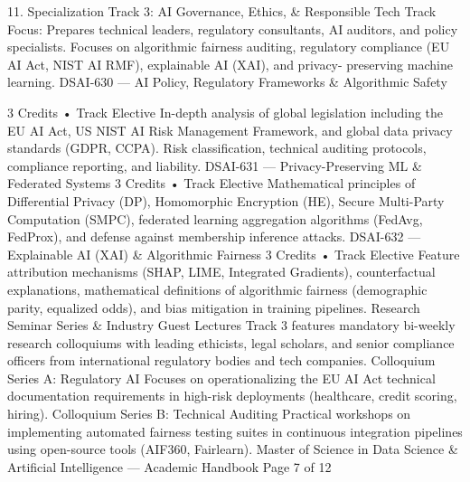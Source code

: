 \documentclass[12pt]{article}
\begin{document}
11. Specialization Track 3: AI Governance, Ethics, \& Responsible Tech
Track Focus: Prepares technical leaders, regulatory consultants, AI auditors, and policy specialists. Focuses on
algorithmic fairness auditing, regulatory compliance (EU AI Act, NIST AI RMF), explainable AI (XAI), and privacy-
preserving machine learning.
DSAI-630 — AI Policy, Regulatory Frameworks \& Algorithmic Safety

3 Credits • Track Elective
In-depth analysis of global legislation including the EU AI Act, US NIST AI Risk Management Framework, and
global data privacy standards (GDPR, CCPA). Risk classification, technical auditing protocols, compliance
reporting, and liability.
DSAI-631 — Privacy-Preserving ML \& Federated Systems
3 Credits • Track Elective
Mathematical principles of Differential Privacy (DP), Homomorphic Encryption (HE), Secure Multi-Party
Computation (SMPC), federated learning aggregation algorithms (FedAvg, FedProx), and defense against
membership inference attacks.
DSAI-632 — Explainable AI (XAI) \& Algorithmic Fairness
3 Credits • Track Elective
Feature attribution mechanisms (SHAP, LIME, Integrated Gradients), counterfactual explanations, mathematical
definitions of algorithmic fairness (demographic parity, equalized odds), and bias mitigation in training pipelines.
Research Seminar Series \& Industry Guest Lectures
Track 3 features mandatory bi-weekly research colloquiums with leading ethicists, legal scholars, and senior
compliance officers from international regulatory bodies and tech companies.
Colloquium Series A: Regulatory AI
Focuses on operationalizing the EU AI Act technical
documentation requirements in high-risk deployments
(healthcare, credit scoring, hiring).
Colloquium Series B: Technical Auditing
Practical workshops on implementing automated fairness
testing suites in continuous integration pipelines using
open-source tools (AIF360, Fairlearn).
Master of Science in Data Science \& Artificial Intelligence — Academic Handbook
Page 7 of 12
\end{document}
